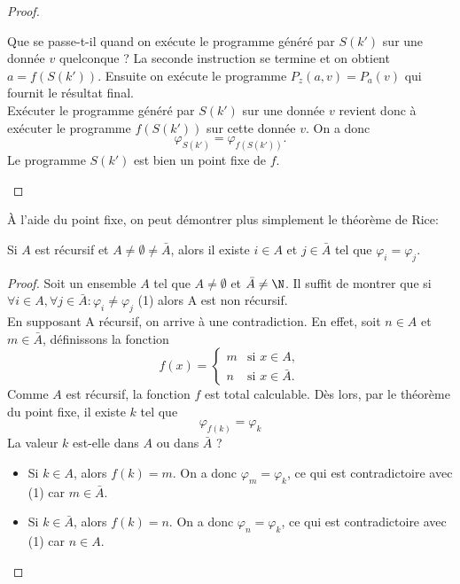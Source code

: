 \begin{proof}
\begin{myrem}
          Que se passe-t-il quand on exécute le programme généré par $S(k')$ sur une donnée $v$ quelconque ?
          La seconde instruction se termine et on obtient $a = f(S(k'))$.
          Ensuite on exécute le programme $P_z(a,v) = P_a(v)$ qui fournit le résultat final. \\
          Exécuter le programme généré par $S(k')$ sur une donnée $v$ revient donc à exécuter le programme $f(S(k'))$ sur cette donnée $v$.
          On a donc
          \[ \varphi_{S(k')} = \varphi_{f(S(k'))}. \]
          Le programme $S(k')$ est bien un point fixe de $f$.
		\end{myrem}
\end{proof}

\begin{myrem}
  À l'aide du point fixe, on peut démontrer plus simplement le théorème de Rice:

\begin{center}
Si $A$ est récursif et $A \neq \emptyset \neq \bar{A}$, alors il existe $i \in A$ et $j \in \bar{A}$ tel que $\varphi_i = \varphi_j$.
\end{center}

  \begin{proof}
    Soit un ensemble $A$ tel que $A \neq \emptyset$ et $\bar{A} \neq \N$.  Il suffit de montrer que si 
    $\forall i \in A, \forall j \in \bar{A} : \varphi_i \neq \varphi_j$  (1) alors A est non récursif. \\
    En supposant A récursif, on arrive à une contradiction.  En effet,
    soit $n \in A$ et $m \in \bar{A}$, définissons la fonction
    \[
      f(x) =
      \begin{cases}
        m & \text{si }x \in A,\\
        n & \text{si }x \in \bar{A}.
      \end{cases}
    \]
    Comme $A$ est récursif, la fonction $f$ est total calculable.
    Dès lors, par le théorème du point fixe, il existe $k$ tel que
    \[ \varphi_{f(k)} = \varphi_k \]
    La valeur $k$ est-elle dans $A$ ou dans $\bar{A}$ ?
    \begin{itemize}
      \item Si $k \in A$, alors $f(k)=m$.  On a donc $\varphi_m = \varphi_k$, ce qui est contradictoire avec (1) car
       $m \in \bar{A}$.
      \item Si $k \in \bar{A}$, alors $f(k)=n$.  On a donc $\varphi_n = \varphi_k$, ce qui est contradictoire avec (1) car
        $n \in A$.
    \end{itemize}
  \end{proof}
\end{myrem}

